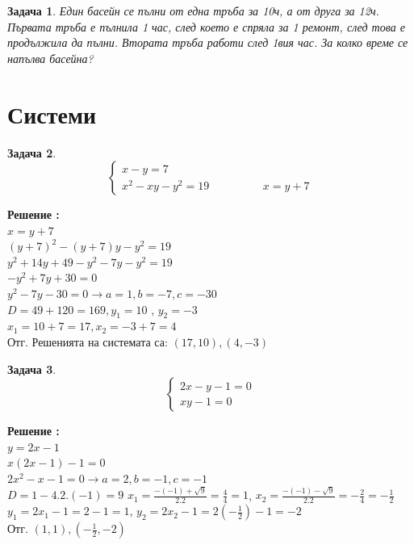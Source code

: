 \documentclass{article}
\newtheorem{problem}{Задача}
\newcounter{solution}
\newcommand\solution{%
	\stepcounter{solution}%
	\textbf{Решение :}\\%
}
\begin{document}
\begin{problem}
	Един басейн се пълни от една тръба за 10ч, а от друга за 12ч. Първата тръба е пълнила 1 час, след което е спряла за 1 ремонт, след това е продължила да пълни. Втората тръба работи след 1вия час. За колко време се напълва басейна?
\end{problem}




\section{Системи}

\begin{problem}
	\[
	\begin{cases}
	x - y = 7 \\
	x^2 - xy - y^2=19 \hspace{2cm} x = y + 7 
	\end{cases}
	\]
\end{problem}

\noindent
\solution
$ x = y + 7 $ \\
$ (y+7)^2 - (y+7)y - y^2 = 19 $ \\
$ y^2 + 14y + 49 - y^2 - 7y - y^2 = 19 $ \\
$ -y^2 + 7y + 30 = 0 $ \\ 
$ y^2 - 7y - 30 = 0  \to a = 1, b = -7 , c = -30$ \\ 
$D = 49 + 120 = 169, y_1 = 10$ , $y_2 = -3 $ \\
$x_1 = 10 + 7 = 17, x_2 = -3 + 7 = 4$ \\
Отг. Решенията на системата са: $(17,10) , (4,-3)   $

\vspace{1cm}

\begin{problem}
	\[
	\begin{cases}
	2x - y -1 = 0 \\
	xy - 1 = 0  
	\end{cases}
	\]
\end{problem}
\solution
$ y = 2x -1$ \\
$ x(2x-1) - 1 = 0 $ \\
$ 2x^2 - x - 1 = 0 \to a=2, b = -1, c= -1$  \\
$ D = 1 - 4.2.(-1) = 9 $
$ x_1 = \frac{-(-1)+ \sqrt{9}}{2.2}= \frac{4}{4} = 1 $, $x_2 = \frac{-(-1)- \sqrt{9}}{2.2}= -\frac{2}{4} = -\frac{1}{2}  $
$ y_1 = 2x_1 - 1 = 2 - 1 = 1 $, $y_2 = 2x_2 - 1 = 2(-\frac{1}{2})-1 = -2  $ \\
Отг. $(1,1), (-\frac{1}{2}, -2  ) $
\end{document}
